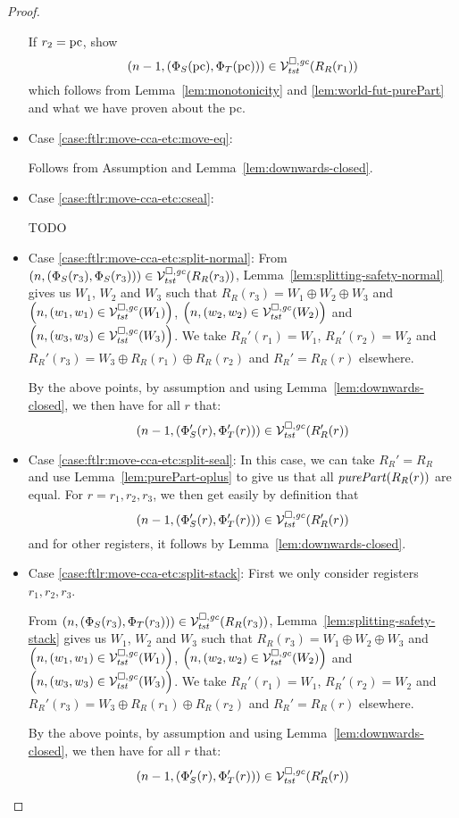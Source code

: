 \begin{proof}
\begin{itemize}
    If $r_2 = \pcreg$, show
    \[
      \npair[n-1]{(\Phi_S(\pcreg),\Phi_T(\pcreg))} \in \lrvg{\trust}(R_R(r_1))
    \]
    which follows from Lemma~\ref{lem:monotonicity} and \ref{lem:world-fut-purePart} and what we have proven about the pc.
  \item Case \ref{case:ftlr:move-cca-etc:move-eq}:
    
    Follows from Assumption and Lemma~\ref{lem:downwards-closed}.

  \item Case \ref{case:ftlr:move-cca-etc:cseal}:

    TODO
  \item Case \ref{case:ftlr:move-cca-etc:split-normal}:
    From $\npair{(\Phi_S(r_3),\Phi_S(r_3))} \in \lrvg{\trust}(R_R(r_3))$, Lemma~\ref{lem:splitting-safety-normal} gives us $W_1$, $W_2$ and $W_3$ such that $R_R(r_3) = W_1 \oplus W_2 \oplus W_3$ and $\npair{(w_1,w_1) \in \lrvg{\trust}(W_1)}$, $\npair{(w_2,w_2) \in \lrvg{\trust}(W_2)}$ and $\npair{(w_3,w_3) \in \lrvg{\trust}(W_3)}$.
    We take $R_R'(r_1) = W_1$, $R_R'(r_2) = W_2$ and $R_R'(r_3) = W_3 \oplus R_R(r_1) \oplus R_R(r_2)$ and $R_R' = R_R(r)$ elsewhere.

    By the above points, by assumption and using Lemma~\ref{lem:downwards-closed}, we then have for all $r$ that:
    \[
      \npair[n-1]{(\Phi_S'(r), \Phi_T'(r))} \in \lrvg{\trust}(R_R'(r))
    \]
  \item Case \ref{case:ftlr:move-cca-etc:split-seal}:
    In this case, we can take $R_R' = R_R$ and use Lemma~\ref{lem:purePart-oplus} to give us that all $\purePart{R_R(r)}$ are equal.
    For $r = r_1, r_2, r_3$, we then get easily by definition that
    \[
      \npair[n-1]{(\Phi_S'(r), \Phi_T'(r))} \in \lrvg{\trust}(R_R'(r))
    \]
    and for other registers, it follows by Lemma~\ref{lem:downwards-closed}.
  \item Case \ref{case:ftlr:move-cca-etc:split-stack}:
    First we only consider registers $r_1,r_2,r_3$.

    From $\npair{(\Phi_S(r_3),\Phi_T(r_3))} \in \lrvg{\trust}(R_R(r_3))$, Lemma~\ref{lem:splitting-safety-stack} gives us $W_1$, $W_2$ and $W_3$ such that $R_R(r_3) = W_1 \oplus W_2 \oplus W_3$ and $\npair{(w_1,w_1) \in \lrvg{\trust}(W_1)}$, $\npair{(w_2,w_2) \in \lrvg{\trust}(W_2)}$ and $\npair{(w_3,w_3) \in \lrvg{\trust}(W_3)}$.
    We take $R_R'(r_1) = W_1$, $R_R'(r_2) = W_2$ and $R_R'(r_3) = W_3 \oplus R_R(r_1) \oplus R_R(r_2)$ and $R_R' = R_R(r)$ elsewhere.

    By the above points, by assumption and using Lemma~\ref{lem:downwards-closed}, we then have for all $r$ that:
    \[
      \npair[n-1]{(\Phi_S'(r), \Phi_T'(r))} \in \lrvg{\trust}(R_R'(r))
    \]


\end{itemize}
\end{proof}
